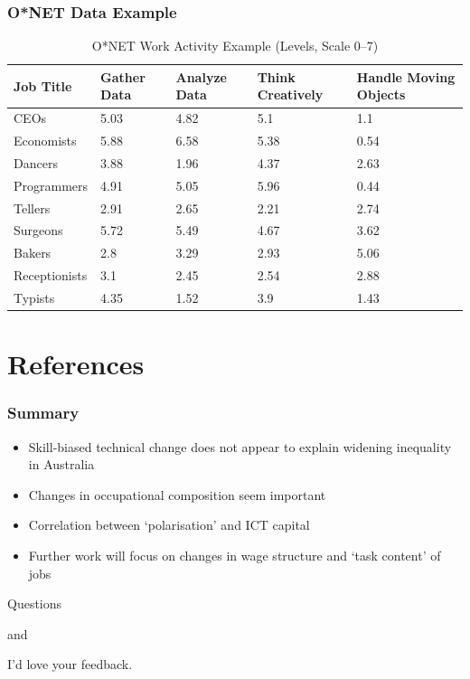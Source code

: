 \documentclass[red]{beamer}
\newcommand{\vitem}{\vfill\item}
\begin{document}
\begin{frame}
\frametitle{O*NET Data Example}
\begin{table}[htbp]
\begin{tabular}{|p{2cm}|p{1.65cm}|p{1.5cm}|p{1.5cm}|p{1.5cm}|}
\hline
{Job Title} & {Gather Data} & {Analyze Data} & {\small Think Creatively} & {Handle Moving Objects} \\ \hline
{CEOs} & 5.03 & 4.82 & 5.1 & 1.1  \\ \hline
{Economists} & 5.88 & 6.58 & 5.38 & 0.54 \\ \hline
{Dancers} & 3.88 & 1.96 & 4.37 & 2.63 \\ \hline
{Programmers} & 4.91 & 5.05 & 5.96 & 0.44 \\ \hline
{Tellers} & 2.91 & 2.65 & 2.21 & 2.74 \\ \hline
{Surgeons} & 5.72 & 5.49 & 4.67 & 3.62 \\ \hline
{Bakers} & 2.8 & 3.29 & 2.93 & 5.06 \\ \hline
{Receptionists} & 3.1 & 2.45 & 2.54 & 2.88 \\ \hline
{Typists} & 4.35 & 1.52 & 3.9 & 1.43 \\ \hline
\end{tabular}
\caption{O*NET Work Activity Example (Levels, Scale 0--7)}
\label{onetex}
\end{table}
\end{frame}

\section*{References}

\begin{frame}
  \frametitle{Summary}
  \begin{itemize}
  \vitem Skill-biased technical change does not appear to explain widening inequality in Australia
  \vitem Changes in occupational composition seem important
  \vitem Correlation between `polarisation' and ICT capital
  \vitem Further work will focus on changes in wage structure and `task content' of jobs
  \end{itemize}
\end{frame}

\begin{frame}
  \begin{center}
    Questions
    \vspace{1cm}

    and
    \vspace{1cm}

    I'd love your feedback.
  \end{center}
\end{frame}
\end{document}
